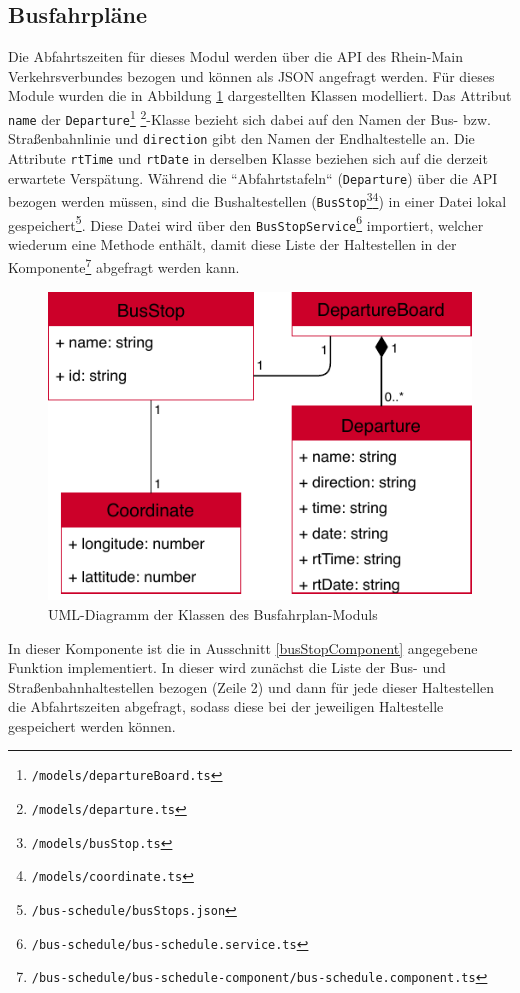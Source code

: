 \subsection{Busfahrpläne}
\label{sec:prog:bus}
Die Abfahrtszeiten für dieses Modul werden über die \acs{API} des Rhein-Main Verkehrsverbundes bezogen und können als \acs{JSON} angefragt werden. Für dieses Module wurden die in Abbildung \ref{fig:programming:busStops} dargestellten Klassen modelliert. Das Attribut \texttt{name} der \texttt{Departure}\footnote{\texttt{/models/departureBoard.ts}} \footnote{\texttt{/models/departure.ts}}-Klasse bezieht sich dabei auf den Namen der Bus- bzw. Straßenbahnlinie und \texttt{direction} gibt den Namen der Endhaltestelle an. Die Attribute \texttt{rtTime} und \texttt{rtDate} in derselben Klasse beziehen sich auf die derzeit erwartete Verspätung. Während die ``Abfahrtstafeln`` (\texttt{Departure}) über die \acs{API} bezogen werden müssen, sind die Bushaltestellen (\texttt{BusStop}\footnote{\texttt{/models/busStop.ts}}\footnote{\texttt{/models/coordinate.ts}}) in einer Datei lokal gespeichert\footnote{\texttt{/bus-schedule/busStops.json}}. Diese Datei wird über den \texttt{BusStopService}\footnote{\texttt{/bus-schedule/bus-schedule.service.ts}} importiert, welcher wiederum eine Methode enthält, damit diese Liste der Haltestellen in der Komponente\footnote{\texttt{/bus-schedule/bus-schedule-component/bus-schedule.component.ts}} abgefragt werden kann.
\begin{figure}[h]
\centering
\includegraphics{gfx/BusStops}
\caption{UML-Diagramm der Klassen des Busfahrplan-Moduls}
\label{fig:programming:busStops}
\end{figure}
In dieser Komponente ist die in Ausschnitt \ref{busStopComponent} angegebene Funktion implementiert. In dieser wird zunächst die Liste der Bus- und Straßenbahnhaltestellen bezogen (Zeile 2) und dann für jede dieser Haltestellen die Abfahrtszeiten abgefragt, sodass diese bei der jeweiligen Haltestelle gespeichert werden können. 

